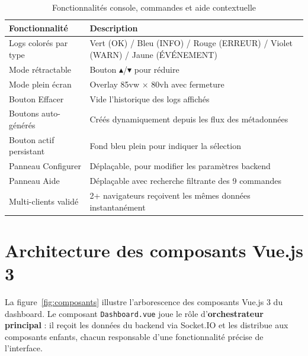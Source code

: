 \documentclass[12pt, a4paper]{report}
\begin{document}
\begin{table}[H]
\centering
\renewcommand{\arraystretch}{1.3}
\begin{tabularx}{\linewidth}{|l|X|}
\hline
\rowcolor{bleuFonce!10}
\textbf{Fonctionnalit\'e} & \textbf{Description} \\
\hline
Logs color\'es par type &
  Vert (OK) / Bleu (INFO) / Rouge (ERREUR) / Violet (WARN) /
  Jaune (\'EV\'ENEMENT) \\
\hline
Mode r\'etractable &
  Bouton $\blacktriangle$/$\blacktriangledown$ pour r\'eduire \\
\hline
Mode plein \'ecran & Overlay 85vw $\times$ 80vh avec fermeture \\
\hline
Bouton Effacer & Vide l'historique des logs affich\'es \\
\hline
Boutons auto-g\'en\'er\'es &
  Cr\'e\'es dynamiquement depuis les flux des m\'etadonn\'ees \\
\hline
Bouton actif persistant &
  Fond bleu plein pour indiquer la s\'election \\
\hline
Panneau Configurer &
  D\'epla\c{c}able, pour modifier les param\`etres backend \\
\hline
Panneau Aide &
  D\'epla\c{c}able avec recherche filtrante des 9 commandes \\
\hline
Multi-clients valid\'e &
  2+ navigateurs re\c{c}oivent les m\^emes donn\'ees instantan\'ement \\
\hline
\end{tabularx}
\caption{Fonctionnalit\'es console, commandes et aide contextuelle}
\label{tab:console}
\end{table}

\section{Architecture des composants Vue.js 3}

La figure~\ref{fig:composants} illustre l'arborescence des composants
Vue.js 3 du dashboard. Le composant \texttt{Dashboard.vue} joue le
r\^ole d'\textbf{orchestrateur principal} : il re\c{c}oit les donn\'ees
du backend via Socket.IO et les distribue aux composants enfants,
chacun responsable d'une fonctionnalit\'e pr\'ecise de l'interface.
\end{document}
